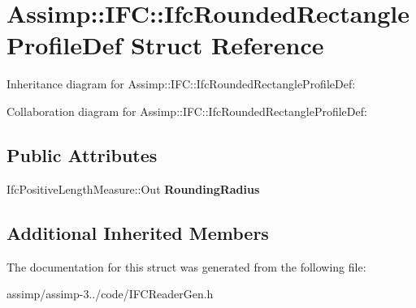 \hypertarget{struct_assimp_1_1_i_f_c_1_1_ifc_rounded_rectangle_profile_def}{\section{Assimp\+:\+:I\+F\+C\+:\+:Ifc\+Rounded\+Rectangle\+Profile\+Def Struct Reference}
\label{struct_assimp_1_1_i_f_c_1_1_ifc_rounded_rectangle_profile_def}
}


Inheritance diagram for Assimp\+:\+:I\+F\+C\+:\+:Ifc\+Rounded\+Rectangle\+Profile\+Def\+:


Collaboration diagram for Assimp\+:\+:I\+F\+C\+:\+:Ifc\+Rounded\+Rectangle\+Profile\+Def\+:
\subsection*{Public Attributes}
\begin{DoxyCompactItemize}
\item 
\hypertarget{struct_assimp_1_1_i_f_c_1_1_ifc_rounded_rectangle_profile_def_a2898affd0828e99bf22772279420330d}{Ifc\+Positive\+Length\+Measure\+::\+Out {\bfseries Rounding\+Radius}}\label{struct_assimp_1_1_i_f_c_1_1_ifc_rounded_rectangle_profile_def_a2898affd0828e99bf22772279420330d}

\end{DoxyCompactItemize}
\subsection*{Additional Inherited Members}


The documentation for this struct was generated from the following file\+:\begin{DoxyCompactItemize}
\item 
assimp/assimp-\/3../code/I\+F\+C\+Reader\+Gen.\+h\end{DoxyCompactItemize}
